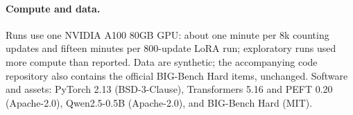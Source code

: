 \paragraph{Compute and data.} Runs use one NVIDIA A100 80GB GPU: about one minute per $8$k counting updates and fifteen minutes per
$800$-update LoRA run; exploratory runs used more compute than reported. Data are synthetic; the accompanying code repository also
contains the official BIG-Bench Hard items, unchanged. Software and assets: PyTorch 2.13 (BSD-3-Clause), Transformers 5.16 and PEFT 0.20 (Apache-2.0), Qwen2.5-0.5B \citep{qwen2025qwen25} (Apache-2.0), and BIG-Bench Hard \citep{suzgun2022challenging} (MIT).


